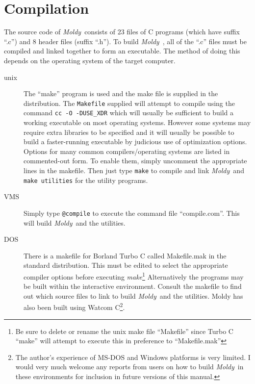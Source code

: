\documentclass[twoside]{report}
\newcommand{\moldy}{{\em Moldy}}
\begin{document}
\section{Compilation}%
The source code of \moldy\  consists of 23 files of C programs (which have
suffix ``.c'') and 8 header files (suffix ``.h'').
To build \moldy\ , all of the ``.c'' files must be compiled and linked
together to form an executable.  The method of doing this depends on
the operating system of the target computer.
\begin{description}
\item[unix]  The ``make'' program is used and the make file is
supplied in the distribution.  The \texttt{Makefile} supplied will attempt
to compile using the command \texttt{cc -O -DUSE\_XDR} which will usually
be sufficient to build a working executable on most operating
systems.  However some systems may require extra libraries to
be specified and it will usually be possible to build a faster-running
executable by judicious use of optimization options. Options for many
common compilers/operating systems are listed in commented-out form.
To enable them, simply uncomment the appropriate lines in the makefile.
Then just type \texttt{make} to compile and link \moldy\  and
\texttt{make utilities} for the utility programs.

\item[VMS]  Simply type \texttt{@compile} to execute the command file
``compile.com''. This will build \moldy\  and the utilities.

\item[DOS] There is a makefile for Borland Turbo C called Makefile.mak
  in the standard distribution.  This must be edited to select the
  appropriate compiler options before executing {\em make}\footnote{Be
    sure to delete or rename the unix make file ``Makefile'' since
    Turbo C ``make'' will attempt to execute this in preference to
    ``Makefile.mak''} Alternatively the programs may be built within
  the interactive environment.  Consult the makefile to find out which
  source files to link to build \moldy\ and the utilities.  Moldy has
  also been built using Watcom C\footnote{The author's experience of
    MS-DOS and Windows platforms is very limited.  I would very much
    welcome any reports from users on how to build \moldy\ in these
    environments for inclusion in future versions of this manual.}.

\end{description}
\end{document}
